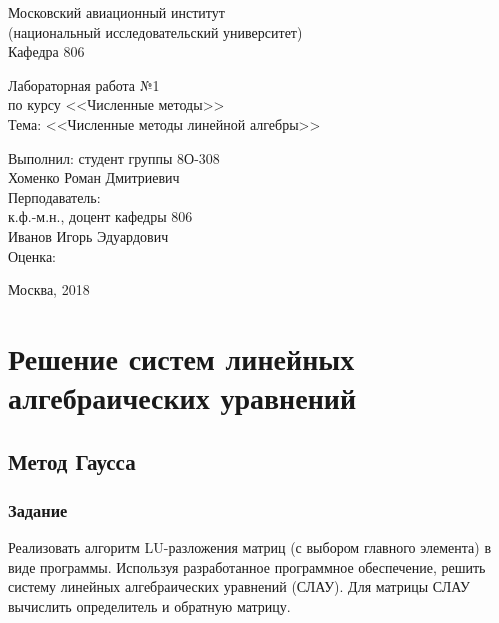 \documentclass[a4paper,12pt]{article}
\begin{document}
\begin{titlepage}
\begin{center}
    {Московский авиационный институт} \\
    {(национальный исследовательский университет)} \\
    {Кафедра 806}

\vspace{8cm}
\large{
    {Лабораторная работа №1} \\
    {по курсу <<Численные методы>>} \\
    {Тема: <<Численные методы линейной алгебры>>}
}
\end{center}

\vspace{6cm}
\begin{flushright}
\begin{minipage}{0.4\textwidth}
    \begin{flushleft}
        {Выполнил: студент группы 8О-308} \\
        {Хоменко Роман Дмитриевич} \\
        \vspace{0.5cm}
        {Перподаватель:} \\
        {к.ф.-м.н., доцент кафедры 806} \\
        {Иванов Игорь Эдуардович} \\
        \vspace{0.5cm}
        Оценка:
    \end{flushleft}
\end{minipage}
\end{flushright}

\vfill
\begin{center}
    {Москва, 2018}
\end{center}

\end{titlepage}

\section{Решение систем линейных алгебраических уравнений}

\subsection{Метод Гаусса}
\subsubsection{Задание}
Реализовать алгоритм LU-разложения матриц (с выбором главного элемента)
в виде программы. Используя разработанное программное обеспечение,
решить систему линейных алгебраических уравнений (СЛАУ). Для матрицы СЛАУ вычислить
определитель и обратную матрицу.
\end{document}
